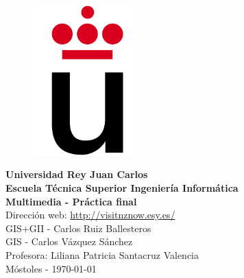 \setlength{\unitlength}{1 cm} %
\thispagestyle{empty}
\begin{figure}[htb]
\begin{center}
\includegraphics[width=4cm]{./Fotos/logoURJC}
\end{center}
\end{figure}
\begin{center}
\textbf{{\Huge Universidad Rey Juan Carlos}\\[0.5cm]
{\LARGE Escuela Técnica Superior Ingeniería Informática}}\\[1cm]

{\LARGE \textbf{Multimedia - Práctica final}}\\[1cm]
{\LARGE Dirección web: \href{http://visitnznow.esy.es/}{http://visitnznow.esy.es/}}\\[2cm]

{\large GIS+GII - Carlos Ruiz Ballesteros}\\[1cm]
{\large GIS - Carlos Vázquez Sánchez}\\[1cm]
{\large Profesora: Liliana Patricia Santacruz Valencia}\\[1cm]
Móstoles - \today
\end{center}